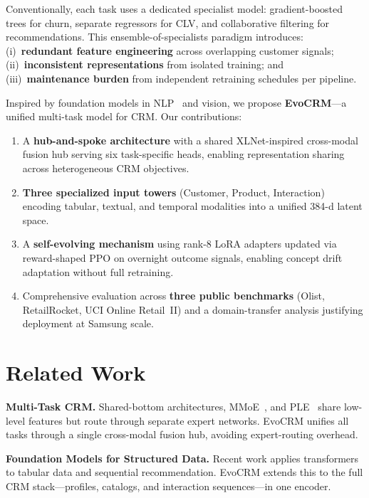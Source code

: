 \documentclass[10pt,twocolumn]{article}
\begin{document}
Conventionally, each task uses a dedicated specialist model: gradient-boosted trees for churn, separate regressors for CLV, and collaborative filtering for recommendations. This ensemble-of-specialists paradigm introduces: (i)~\textbf{redundant feature engineering} across overlapping customer signals; (ii)~\textbf{inconsistent representations} from isolated training; and (iii)~\textbf{maintenance burden} from independent retraining schedules per pipeline.

Inspired by foundation models in NLP~\cite{yang2019xlnet,devlin2019bert} and vision, we propose \textbf{EvoCRM}---a unified multi-task model for CRM. Our contributions:

\begin{enumerate}[leftmargin=*,itemsep=1pt,topsep=2pt]
  \item A \textbf{hub-and-spoke architecture} with a shared XLNet-inspired cross-modal fusion hub serving six task-specific heads, enabling representation sharing across heterogeneous CRM objectives.
  \item \textbf{Three specialized input towers} (Customer, Product, Interaction) encoding tabular, textual, and temporal modalities into a unified 384-d latent space.
  \item A \textbf{self-evolving mechanism} using rank-8 LoRA adapters updated via reward-shaped PPO on overnight outcome signals, enabling concept drift adaptation without full retraining.
  \item Comprehensive evaluation across \textbf{three public benchmarks} (Olist, RetailRocket, UCI Online Retail~II) and a domain-transfer analysis justifying deployment at Samsung scale.
\end{enumerate}

\section{Related Work}

\textbf{Multi-Task CRM.} Shared-bottom architectures, MMoE~\cite{ma2018mmoe}, and PLE~\cite{tang2020ple} share low-level features but route through separate expert networks. EvoCRM unifies all tasks through a single cross-modal fusion hub, avoiding expert-routing overhead.

\textbf{Foundation Models for Structured Data.} Recent work applies transformers to tabular data and sequential recommendation. EvoCRM extends this to the full CRM stack---profiles, catalogs, and interaction sequences---in one encoder.
\end{document}
